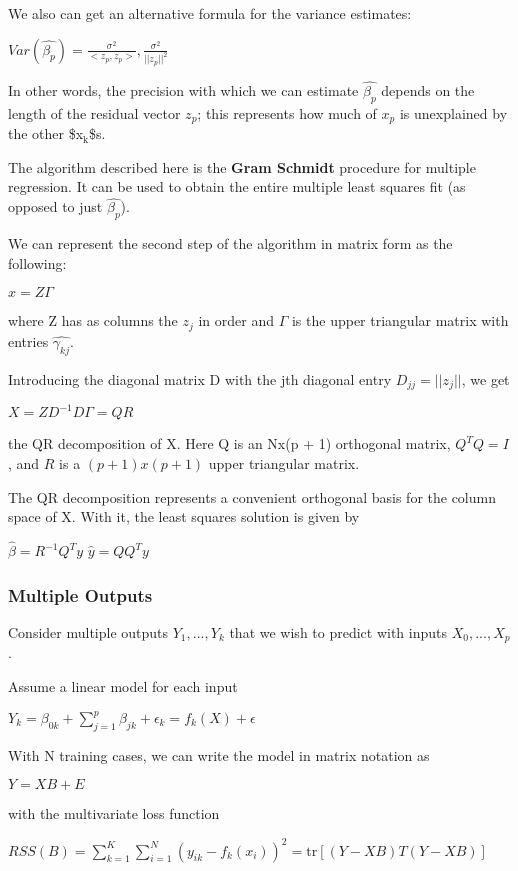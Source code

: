 \documentclass[11pt]{article}
\begin{document}
We also can get an alternative formula for the variance estimates:

\(Var(\hat{\beta_p}) = \frac{\sigma^2}{<z_p, z_p>}, \frac{\sigma^2}{||z_p||^2}\)

In other words, the precision with which we can estimate \(\hat{\beta_p}\) depends on the length of the residual vector \(z_p\); this represents how much of \(x_p\) is unexplained by the other \$x\(_{\text{k}}\)\$s.

The algorithm described here is the \textbf{Gram Schmidt} procedure for multiple regression. It can be used to obtain the entire multiple least squares fit (as opposed to just \(\hat{\beta_p}\)).

We can represent the second step of the algorithm in matrix form as the following:

\(x = Z\Gamma\)

where Z has as columns the \(z_j\) in order and \(\Gamma\) is the upper triangular matrix with entries \(\hat{\gamma_{kj}}\). 

Introducing the diagonal matrix D with the jth diagonal entry \(D_{jj} = ||z_j||\), we get 

\(X = ZD^{-1}D\Gamma = QR\)

the QR decomposition of X. Here Q is an Nx(p + 1) orthogonal matrix, \(Q^TQ = I\), and \(R\) is a \((p+1)x(p+1)\) upper triangular matrix. 

The QR decomposition represents a convenient orthogonal basis for the column space of X. With it, the least squares solution is given by

\(\hat{\beta} = R^{-1}Q^Ty\)
\(\hat{y} = QQ^Ty\)

\subsubsection{Multiple Outputs}
\label{sec:org5250f43}

Consider multiple outputs \(Y_1, ..., Y_k\) that we wish to predict with inputs \(X_0, ..., X_p\). 

Assume a linear model for each input 

\(Y_k = \beta_{0k} + \sum_{j=1}^p \beta_{jk} + \epsilon_k = f_k(X) + \epsilon\)

With N training cases, we can write the model in matrix notation as 

\(Y = XB + E\)

with the multivariate loss function

\(RSS(B) = \sum_{k=1}^K\sum_{i=1}^N(y_{ik} - f_k(x_i))^2 = \mathrm{tr}[(Y - XB)T(Y - XB)]\)
\end{document}
